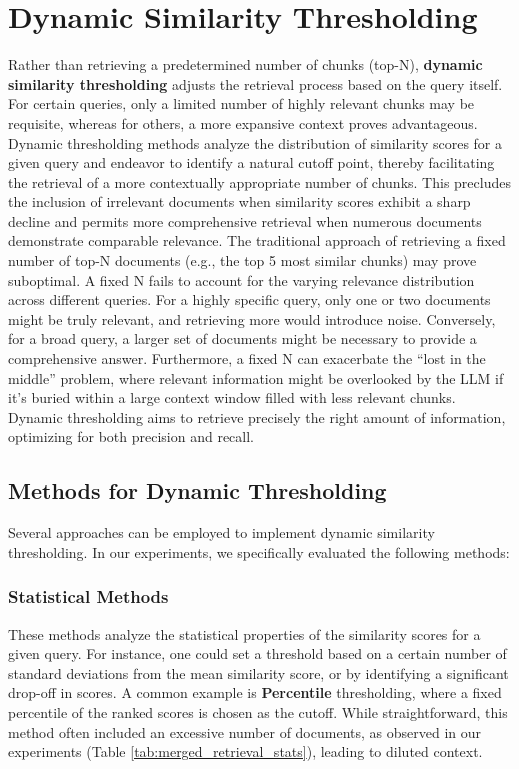 \section{Dynamic Similarity Thresholding}
Rather than retrieving a predetermined number of chunks (top-N), \textbf{dynamic similarity thresholding} adjusts the retrieval process based on the query itself. For certain queries, only a limited number of highly relevant chunks may be requisite, whereas for others, a more expansive context proves advantageous. Dynamic thresholding methods analyze the distribution of similarity scores for a given query and endeavor to identify a natural cutoff point, thereby facilitating the retrieval of a more contextually appropriate number of chunks. This precludes the inclusion of irrelevant documents when similarity scores exhibit a sharp decline and permits more comprehensive retrieval when numerous documents demonstrate comparable relevance. The traditional approach of retrieving a fixed number of top-N documents (e.g., the top 5 most similar chunks) may prove suboptimal. A fixed N fails to account for the varying relevance distribution across different queries. For a highly specific query, only one or two documents might be truly relevant, and retrieving more would introduce noise. Conversely, for a broad query, a larger set of documents might be necessary to provide a comprehensive answer. Furthermore, a fixed N can exacerbate the \enquote{lost in the middle} problem, where relevant information might be overlooked by the LLM if it's buried within a large context window filled with less relevant chunks. Dynamic thresholding aims to retrieve precisely the right amount of information, optimizing for both precision and recall.

\subsection{Methods for Dynamic Thresholding}
Several approaches can be employed to implement dynamic similarity thresholding. In our experiments, we specifically evaluated the following methods:

\subsubsection{Statistical Methods}
These methods analyze the statistical properties of the similarity scores for a given query. For instance, one could set a threshold based on a certain number of standard deviations from the mean similarity score, or by identifying a significant drop-off in scores. A common example is \textbf{Percentile} thresholding, where a fixed percentile of the ranked scores is chosen as the cutoff. While straightforward, this method often included an excessive number of documents, as observed in our experiments (Table \ref{tab:merged_retrieval_stats}), leading to diluted context.

